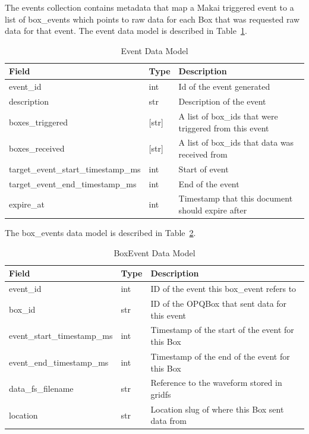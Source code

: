 The events collection contains metadata that map a Makai triggered event to a list of box\_events which points to raw data for each Box that was requested raw data for that event. The event data model is described in Table~\ref{table:Events}.

\begin{table}[H]
	\centering
	\caption{Event Data Model}
	\begin{tabularx}{\textwidth}{llX}
		\toprule
		\textbf{Field} & \textbf{Type} & \textbf{Description} \\
		\midrule
		event\_id & int & Id of the event generated \\
		description & str & Description of the event \\
		boxes\_triggered & [str] & A list of box\_ids that were triggered from this event \\
		boxes\_received & [str] & A list of box\_ids that data was received from \\
		target\_event\_start\_timestamp\_ms & int & Start of event \\
		target\_event\_end\_timestamp\_ms & int & End of the event \\
		expire\_at & int & Timestamp that this document should expire after \\
		\bottomrule
	\end{tabularx}
	\label{table:Events}
\end{table}

The box\_events data model is described in Table~\ref{table:BoxEvents}.

\begin{table}[H]
    \centering
    \caption{BoxEvent Data Model}
    \begin{tabularx}{\textwidth}{llX}
        \toprule
        \textbf{Field} & \textbf{Type} & \textbf{Description} \\
        \midrule
        event\_id & int & ID of the event this box\_event refers to \\
        box\_id & str & ID of the OPQBox that sent data for this event \\
        event\_start\_timestamp\_ms & int & Timestamp of the start of the event for this Box \\
        event\_end\_timestamp\_ms & int & Timestamp of the end of the event for this Box \\
        data\_fs\_filename & str & Reference to the waveform stored in gridfs \\
        location & str & Location slug of where this Box sent data from \\
        \bottomrule
    \end{tabularx}
    \label{table:BoxEvents}
\end{table}

